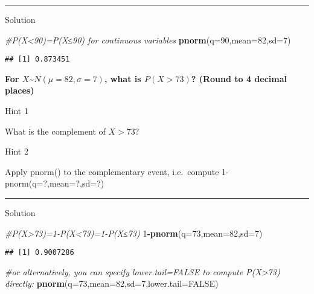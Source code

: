 \documentclass[
]{book}
\newenvironment{Shaded}{\begin{snugshade}}{\end{snugshade}}
\newcommand{\AttributeTok}[1]{\textcolor[rgb]{0.13,0.29,0.53}{#1}}
\newcommand{\CommentTok}[1]{\textcolor[rgb]{0.56,0.35,0.01}{\textit{#1}}}
\newcommand{\ConstantTok}[1]{\textcolor[rgb]{0.56,0.35,0.01}{#1}}
\newcommand{\DecValTok}[1]{\textcolor[rgb]{0.00,0.00,0.81}{#1}}
\newcommand{\FunctionTok}[1]{\textcolor[rgb]{0.13,0.29,0.53}{\textbf{#1}}}
\newcommand{\NormalTok}[1]{#1}
\newcommand{\SpecialCharTok}[1]{\textcolor[rgb]{0.81,0.36,0.00}{\textbf{#1}}}
\begin{document}
\begin{center}\rule{0.5\linewidth}{0.5pt}\end{center}

Solution

\begin{Shaded}
\begin{Highlighting}[]
\CommentTok{\#P(X\textless{}90)=P(X≤90) for continuous variables}
\FunctionTok{pnorm}\NormalTok{(}\AttributeTok{q=}\DecValTok{90}\NormalTok{,}\AttributeTok{mean=}\DecValTok{82}\NormalTok{,}\AttributeTok{sd=}\DecValTok{7}\NormalTok{)}
\end{Highlighting}
\end{Shaded}

\begin{verbatim}
## [1] 0.873451
\end{verbatim}

\textbf{For \(X\)\textasciitilde{}\(N(\mu=82,\sigma=7)\), what is \(P(X>73)\)? (Round to 4 decimal places)}

Hint 1

What is the complement of \(X>73\)?

Hint 2

Apply pnorm() to the complementary event, i.e.~compute
1-pnorm(q=?,mean=?,sd=?)

\begin{center}\rule{0.5\linewidth}{0.5pt}\end{center}

Solution

\begin{Shaded}
\begin{Highlighting}[]
\CommentTok{\#P(X\textgreater{}73)=1{-}P(X\textless{}73)=1{-}P(X≤73)}
\DecValTok{1}\SpecialCharTok{{-}}\FunctionTok{pnorm}\NormalTok{(}\AttributeTok{q=}\DecValTok{73}\NormalTok{,}\AttributeTok{mean=}\DecValTok{82}\NormalTok{,}\AttributeTok{sd=}\DecValTok{7}\NormalTok{)}
\end{Highlighting}
\end{Shaded}

\begin{verbatim}
## [1] 0.9007286
\end{verbatim}

\begin{Shaded}
\begin{Highlighting}[]
\CommentTok{\#or alternatively, you can specify lower.tail=FALSE to compute P(X\textgreater{}73) directly:}
\FunctionTok{pnorm}\NormalTok{(}\AttributeTok{q=}\DecValTok{73}\NormalTok{,}\AttributeTok{mean=}\DecValTok{82}\NormalTok{,}\AttributeTok{sd=}\DecValTok{7}\NormalTok{,}\AttributeTok{lower.tail=}\ConstantTok{FALSE}\NormalTok{)}
\end{Highlighting}
\end{Shaded}
\end{document}
